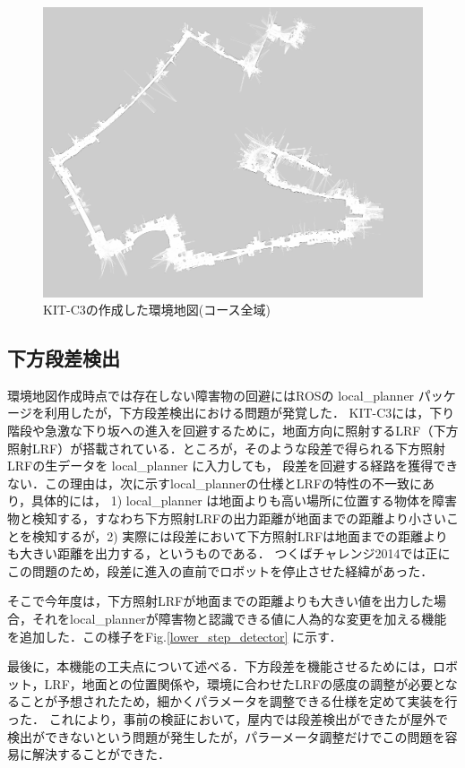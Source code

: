 \documentclass[10pt,a4paper]{jarticle}
\begin{document}
\begin{figure}
  \centering
  \includegraphics[width=14cm]{fig/png/gridmap.png}
  \caption{KIT-C3の作成した環境地図(コース全域)}
  \label{204704_18Dec14}
\end{figure}
\subsection{下方段差検出}
環境地図作成時点では存在しない障害物の回避にはROSの local\_planner パッケージを利用したが，下方段差検出における問題が発覚した．
KIT-C3には，下り階段や急激な下り坂への進入を回避するために，地面方向に照射するLRF（下方照射LRF）が搭載されている．ところが，そのような段差で得られる下方照射LRFの生データを local\_planner に入力しても，
段差を回避する経路を獲得できない．この理由は，次に示すlocal\_plannerの仕様とLRFの特性の不一致にあり，具体的には，
1)  local\_planner は地面よりも高い場所に位置する物体を障害物と検知する，すなわち下方照射LRFの出力距離が地面までの距離より小さいことを検知するが，2) 実際には段差において下方照射LRFは地面までの距離よりも大きい距離を出力する，というものである．
つくばチャレンジ2014では正にこの問題のため，段差に進入の直前でロボットを停止させた経緯があった．

そこで今年度は，下方照射LRFが地面までの距離よりも大きい値を出力した場合，それをlocal\_plannerが障害物と認識できる値に人為的な変更を加える機能を追加した．この様子をFig.\ref{lower_step_detector} に示す．

最後に，本機能の工夫点について述べる．下方段差を機能させるためには，ロボット，LRF，地面との位置関係や，環境に合わせたLRFの感度の調整が必要となることが予想されたため，細かくパラメータを調整できる仕様を定めて実装を行った．
これにより，事前の検証において，屋内では段差検出ができたが屋外で検出ができないという問題が発生したが，パラーメータ調整だけでこの問題を容易に解決することができた．
\end{document}
